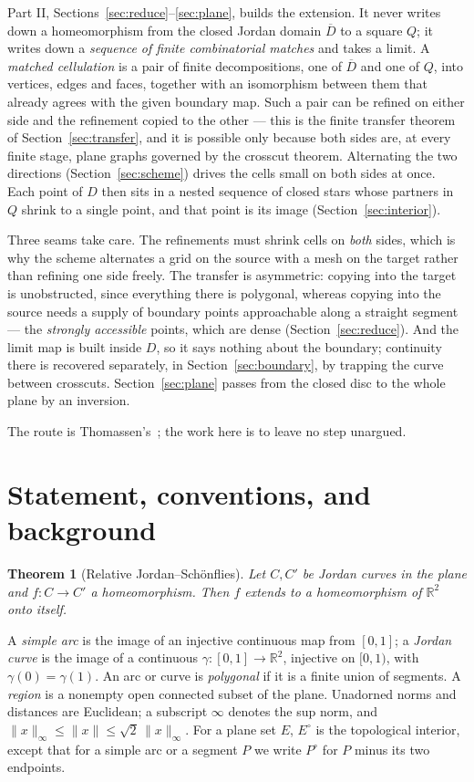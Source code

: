 \documentclass[11pt,a4paper]{article}
\theoremstyle{jsplain}
\newtheorem{theorem}{Theorem}[section]
\theoremstyle{jsdefn}
\begin{document}
Part II, Sections~\ref{sec:reduce}--\ref{sec:plane}, builds the
extension. It never writes down a homeomorphism from the closed Jordan
domain $\overline D$ to a square $Q$; it writes down a
\emph{sequence of finite combinatorial matches} and takes a limit. A
\emph{matched cellulation} is a pair of finite decompositions, one of
$\overline D$ and one of $Q$, into vertices, edges and faces, together
with an isomorphism between them that already agrees with the given
boundary map. Such a pair can be refined on either side and the
refinement copied to the other --- this is the finite transfer theorem
of Section~\ref{sec:transfer}, and it is possible only because both
sides are, at every finite stage, plane graphs governed by the crosscut
theorem. Alternating the two directions (Section~\ref{sec:scheme})
drives the cells small on both sides at once. Each point of $D$ then
sits in a nested sequence of closed stars whose partners in $Q$ shrink
to a single point, and that point is its image
(Section~\ref{sec:interior}).

Three seams take care. The refinements must shrink cells on \emph{both}
sides, which is why the scheme alternates a grid on the source with a
mesh on the target rather than refining one side freely. The transfer is
asymmetric: copying into the target is unobstructed, since everything
there is polygonal, whereas copying into the source needs a supply of
boundary points approachable along a straight segment --- the
\emph{strongly accessible} points, which are dense
(Section~\ref{sec:reduce}). And the limit map is built inside $D$, so it
says nothing about the boundary; continuity there is recovered
separately, in Section~\ref{sec:boundary}, by trapping the curve
between crosscuts. Section~\ref{sec:plane} passes from the closed disc
to the whole plane by an inversion.

The route is Thomassen's~\cite{Thomassen}; the work here is to leave no
step unargued.

\section{Statement, conventions, and background}

\begin{theorem}[Relative Jordan--Schönflies]\label{thm:main}
Let $C,C'$ be Jordan curves in the plane and $f:C\to C'$ a
homeomorphism. Then $f$ extends to a homeomorphism of
$\mathbb R^2$ onto itself.
\end{theorem}

A \emph{simple arc} is the image of an injective continuous map from
$[0,1]$; a \emph{Jordan curve} is the image of a continuous
$\gamma:[0,1]\to\mathbb R^2$, injective on $[0,1)$, with
$\gamma(0)=\gamma(1)$. An arc or curve is \emph{polygonal} if it is a
finite union of segments. A \emph{region} is a nonempty open connected
subset of the plane. Unadorned norms and distances are Euclidean; a
subscript $\infty$ denotes the sup norm, and
$\|x\|_\infty\le\|x\|\le\sqrt2\,\|x\|_\infty$. For a plane set $E$,
$E^\circ$ is the topological interior, except that for a simple arc or
a segment $P$ we write $P^\circ$ for $P$ minus its two endpoints.
\end{document}
